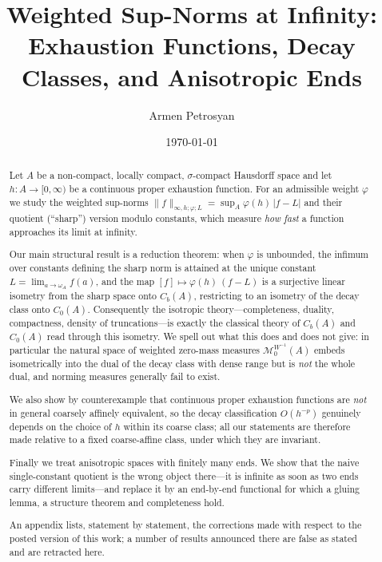 \documentclass[11pt,a4paper]{article}
\numberwithin{equation}{section}
\theoremstyle{plain}
\theoremstyle{definition}
\theoremstyle{remark}
\newcommand{\wA}{\omega_A}
\newcommand{\Cb}{C_b}
\newcommand{\Cz}{C_0}
\newcommand{\Msp}{\mathcal{M}}
\begin{document}
\title{Weighted Sup-Norms at Infinity:\\
Exhaustion Functions, Decay Classes, and Anisotropic Ends}
\author{Armen Petrosyan}
\date{\today}
\maketitle

\begin{abstract}
Let $A$ be a non-compact, locally compact, $\sigma$-compact Hausdorff space and let
$h:A\to[0,\infty)$ be a continuous proper exhaustion function. For an admissible weight
$\varphi$ we study the weighted sup-norms
$\|f\|_{\infty,h;\varphi;L}=\sup_A \varphi(h)\,|f-L|$ and their quotient (``sharp'')
version modulo constants, which measure \emph{how fast} a function approaches its limit
at infinity.

Our main structural result is a reduction theorem: when $\varphi$ is unbounded, the
infimum over constants defining the sharp norm is attained at the unique constant
$L=\lim_{a\to\wA}f(a)$, and the map $[f]\mapsto \varphi(h)\,(f-L)$ is a surjective linear
isometry from the sharp space onto $\Cb(A)$, restricting to an isometry of the decay class
onto $\Cz(A)$. Consequently the isotropic theory---completeness, duality, compactness,
density of truncations---is exactly the classical theory of $\Cb(A)$ and $\Cz(A)$ read
through this isometry. We spell out what this does and does not give: in particular the
natural space of weighted zero-mass measures $\Msp_0^{W^{-1}}(A)$ embeds isometrically
into the dual of the decay class with dense range but is \emph{not} the whole dual, and
norming measures generally fail to exist.

We also show by counterexample that continuous proper exhaustion functions are \emph{not}
in general coarsely affinely equivalent, so the decay classification $O(h^{-p})$ genuinely
depends on the choice of $h$ within its coarse class; all our statements are therefore made
relative to a fixed coarse-affine class, under which they are invariant.

Finally we treat anisotropic spaces with finitely many ends. We show that the naive
single-constant quotient is the wrong object there---it is infinite as soon as two ends
carry different limits---and replace it by an end-by-end functional for which a
gluing lemma, a structure theorem and completeness hold.

An appendix lists, statement by statement, the corrections made with respect to the
posted version of this work; a number of results announced there are false as stated and
are retracted here.
\end{abstract}
\end{document}
